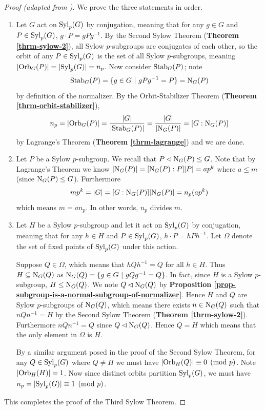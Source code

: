 \begin{proof}[Proof (adapted from \cite{wielandt_1959})]
    We prove the three statements in order.
    \begin{enumerate}
        \item Let $G$ act on $\mathrm{Syl}_{p}(G)$ by conjugation, meaning that for any $g \in G$ and $P \in \mathrm{Syl}_{p}(G)$, $g\cdot P = gPg^{-1}$. By the Second Sylow Theorem (\textbf{Theorem \ref{thrm-sylow-2}}), all Sylow $p$-subgroups are conjugates of each other, so the orbit of any $P \in \mathrm{Syl}_{p}(G)$ is the set of all Sylow $p$-subgroups, meaning $|\mathrm{Orb}_{G}(P)| = |\mathrm{Syl}_{p}(G)| = n_p$. Now consider $\mathrm{Stab}_{G}(P)$; note
        \[
            \mathrm{Stab}_{G}(P) = \{g \in G \ | \  gPg^{-1} = P\} = \mathrm{N}_{G}(P)
        \]
        by definition of the normalizer. By the Orbit-Stabilizer Theorem (\textbf{Theorem \ref{thrm-orbit-stabilizer}}),
        \[
            n_p = |\mathrm{Orb}_{G}(P)| = \frac{|G|}{|\mathrm{Stab}_{G}(P)|} = \frac{|G|}{|\mathrm{N}_{G}(P)|} = [G : \mathrm{N}_{G}(P)]
        \]
        by Lagrange's Theorem (\textbf{Theorem \ref{thrm-lagrange}}) and we are done.

        \item Let $P$ be a Sylow $p$-subgroup. We recall that $P \lhd \mathrm{N}_{G}(P) \leq G$. Note that by Lagrange's Theorem we know $|\mathrm{N}_{G}(P)| = [\mathrm{N}_{G}(P) : P]|P| = ap^k$ where $a \leq m$ (since $\mathrm{N}_{G}(P) \leq G$). Furthermore
        \[
            mp^k = |G| = [G: \mathrm{N}_{G}(P)]|\mathrm{N}_{G}(P)| = n_p(ap^k)
        \]
        which means $m = an_p$. In other words, $n_p$ divides $m$.

        \item Let $H$ be a Sylow $p$-subgroup and let it act on $\mathrm{Syl}_{p}(G)$ by conjugation, meaning that for any $h \in H$ and $P \in \mathrm{Syl}_{p}(G)$, $h \cdot P = hPh^{-1}$. Let $\Omega$ denote the set of fixed points of $\mathrm{Syl}_{p}(G)$ under this action.

        Suppose $Q \in \Omega$, which means that $hQh^{-1} = Q$ for all $h \in H$. Thus $H \subseteq \mathrm{N}_{G}(Q)$ as $\mathrm{N}_{G}(Q) = \{g \in G \ | \  gQg^{-1} = Q\}$. In fact, since $H$ is a Sylow $p$-subgroup, $H \leq \mathrm{N}_{G}(Q)$. We note $Q \lhd \mathrm{N}_{G}(Q)$ by \textbf{Proposition \ref{prop-subgroup-is-a-normal-subgroup-of-normalizer}}. Hence $H$ and $Q$ are Sylow $p$-subgroups of $\mathrm{N}_{G}(Q)$, which means there exists $n \in \mathrm{N}_{G}(Q)$ such that $nQn^{-1} = H$ by the Second Sylow Theorem (\textbf{Theorem \ref{thrm-sylow-2}}). Furthermore $nQn^{-1} = Q$ since $Q \lhd \mathrm{N}_{G}(Q)$. Hence $Q = H$ which means that the only element in $\Omega$ is $H$.

        By a similar argument posed in the proof of the Second Sylow Theorem, for any $Q \in \mathrm{Syl}_{p}(G)$ where $Q \neq H$ we must have $|\mathrm{Orb}_{H}(Q)| \equiv 0 \pmod p$. Note $|\mathrm{Orb}_{H}(H)| = 1$. Now since distinct orbits partition $\mathrm{Syl}_{p}(G)$, we must have $n_p = |\mathrm{Syl}_{p}(G)| \equiv 1 \pmod p$.
    \end{enumerate}
    This completes the proof of the Third Sylow Theorem.
\end{proof}

